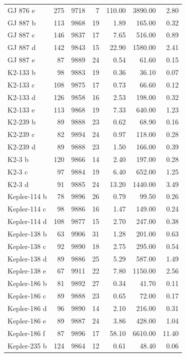 \begin{table}
\begin{tabular}{lrrrrrr}
GJ 876 e & 275 & 9718 & 7 & 110.00 & 3890.00 & 2.80 \\
GJ 887 b & 113 & 9868 & 19 & 1.89 & 165.00 & 0.32 \\
GJ 887 c & 146 & 9837 & 17 & 7.65 & 516.00 & 0.89 \\
GJ 887 d & 142 & 9843 & 15 & 22.90 & 1580.00 & 2.41 \\
GJ 887 e & 87 & 9889 & 24 & 0.54 & 61.60 & 0.15 \\
K2-133 b & 98 & 9883 & 19 & 0.36 & 36.10 & 0.07 \\
K2-133 c & 108 & 9875 & 17 & 0.73 & 66.60 & 0.12 \\
K2-133 d & 126 & 9858 & 16 & 2.53 & 198.00 & 0.32 \\
K2-133 e & 113 & 9868 & 19 & 7.33 & 640.00 & 1.23 \\
K2-239 b & 89 & 9888 & 23 & 0.62 & 68.90 & 0.16 \\
K2-239 c & 82 & 9894 & 24 & 0.97 & 118.00 & 0.28 \\
K2-239 d & 89 & 9888 & 23 & 1.50 & 166.00 & 0.39 \\
K2-3 b & 120 & 9866 & 14 & 2.40 & 197.00 & 0.28 \\
K2-3 c & 97 & 9884 & 19 & 6.40 & 652.00 & 1.25 \\
K2-3 d & 91 & 9885 & 24 & 13.20 & 1440.00 & 3.49 \\
Kepler-114 b & 78 & 9896 & 26 & 0.79 & 99.50 & 0.26 \\
Kepler-114 c & 98 & 9886 & 16 & 1.47 & 149.00 & 0.24 \\
Kepler-114 d & 108 & 9877 & 15 & 2.70 & 247.00 & 0.38 \\
Kepler-138 b & 63 & 9906 & 31 & 1.28 & 201.00 & 0.63 \\
Kepler-138 c & 92 & 9890 & 18 & 2.75 & 295.00 & 0.54 \\
Kepler-138 d & 89 & 9886 & 25 & 5.29 & 587.00 & 1.49 \\
Kepler-138 e & 67 & 9911 & 22 & 7.80 & 1150.00 & 2.56 \\
Kepler-186 b & 81 & 9892 & 27 & 0.34 & 41.70 & 0.11 \\
Kepler-186 c & 89 & 9888 & 23 & 0.65 & 72.00 & 0.17 \\
Kepler-186 d & 96 & 9890 & 14 & 2.10 & 216.00 & 0.31 \\
Kepler-186 e & 89 & 9887 & 24 & 3.86 & 428.00 & 1.04 \\
Kepler-186 f & 87 & 9896 & 17 & 58.10 & 6610.00 & 11.40 \\
Kepler-235 b & 124 & 9864 & 12 & 0.61 & 48.40 & 0.06 \\

\end{tabular}
\end{table}
